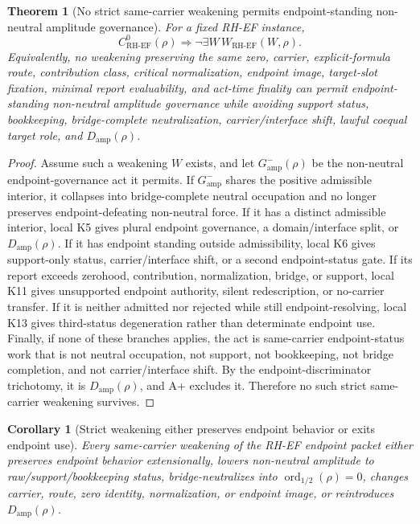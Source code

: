 \documentclass[11pt]{article}
\newtheorem{theorem}{Theorem}[section]
\newtheorem{corollary}{Corollary}[section]
\newcommand{\Damp}{D_{\mathrm{amp}}}
\newcommand{\ordhalf}{\operatorname{ord}_{1/2}}
\newcommand{\CoreRHEF}{C^{0}_{\mathrm{RH}\text{-}\mathrm{EF}}}
\newcommand{\WeakRHEF}{W_{\mathrm{RH}\text{-}\mathrm{EF}}}
\newcommand{\Gamp}{G^{-}_{\mathrm{amp}}}
\begin{document}
\begin{theorem}[No strict same-carrier weakening permits endpoint-standing non-neutral amplitude governance]
For a fixed RH-EF instance,
\[
\CoreRHEF(\rho)\Rightarrow \neg\exists W\,\WeakRHEF(W,\rho).
\]
Equivalently, no weakening preserving the same zero, carrier, explicit-formula route, contribution class, critical normalization, endpoint image, target-slot fixation, minimal report evaluability, and act-time finality can permit endpoint-standing non-neutral amplitude governance while avoiding support status, bookkeeping, bridge-complete neutralization, carrier/interface shift, lawful coequal target role, and \(\Damp(\rho)\).
\end{theorem}

\begin{proof}
Assume such a weakening \(W\) exists, and let \(\Gamp(\rho)\) be the non-neutral endpoint-governance act it permits.  If \(\Gamp\) shares the positive admissible interior, it collapses into bridge-complete neutral occupation and no longer preserves endpoint-defeating non-neutral force.  If it has a distinct admissible interior, local K5 gives plural endpoint governance, a domain/interface split, or \(\Damp(\rho)\).  If it has endpoint standing outside admissibility, local K6 gives support-only status, carrier/interface shift, or a second endpoint-status gate.  If its report exceeds zerohood, contribution, normalization, bridge, or support, local K11 gives unsupported endpoint authority, silent redescription, or no-carrier transfer.  If it is neither admitted nor rejected while still endpoint-resolving, local K13 gives third-status degeneration rather than determinate endpoint use.  Finally, if none of these branches applies, the act is same-carrier endpoint-status work that is not neutral occupation, not support, not bookkeeping, not bridge completion, and not carrier/interface shift.  By the endpoint-discriminator trichotomy, it is \(\Damp(\rho)\), and A+ excludes it.  Therefore no such strict same-carrier weakening survives.
\end{proof}

\begin{corollary}[Strict weakening either preserves endpoint behavior or exits endpoint use]
Every same-carrier weakening of the RH-EF endpoint packet either preserves endpoint behavior extensionally, lowers non-neutral amplitude to raw/support/bookkeeping status, bridge-neutralizes into \(\ordhalf(\rho)=0\), changes carrier, route, zero identity, normalization, or endpoint image, or reintroduces \(\Damp(\rho)\).
\end{corollary}
\end{document}
